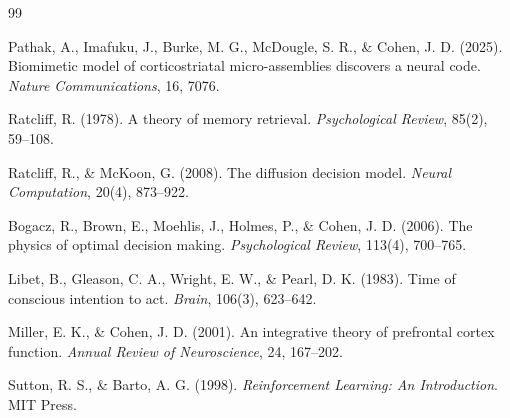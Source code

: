 \documentclass[11pt]{article}
\begin{document}
\begin{thebibliography}{99}

Pathak, A., Imafuku, J., Burke, M. G., McDougle, S. R., \& Cohen, J. D. (2025).
Biomimetic model of corticostriatal micro-assemblies discovers a neural code.
\emph{Nature Communications}, 16, 7076.

Ratcliff, R. (1978).
A theory of memory retrieval.
\emph{Psychological Review}, 85(2), 59--108.

Ratcliff, R., \& McKoon, G. (2008).
The diffusion decision model.
\emph{Neural Computation}, 20(4), 873--922.

Bogacz, R., Brown, E., Moehlis, J., Holmes, P., \& Cohen, J. D. (2006).
The physics of optimal decision making.
\emph{Psychological Review}, 113(4), 700--765.

Libet, B., Gleason, C. A., Wright, E. W., \& Pearl, D. K. (1983).
Time of conscious intention to act.
\emph{Brain}, 106(3), 623--642.

Miller, E. K., \& Cohen, J. D. (2001).
An integrative theory of prefrontal cortex function.
\emph{Annual Review of Neuroscience}, 24, 167--202.

Sutton, R. S., \& Barto, A. G. (1998).
\emph{Reinforcement Learning: An Introduction}.
MIT Press.

\end{thebibliography}
\end{document}
